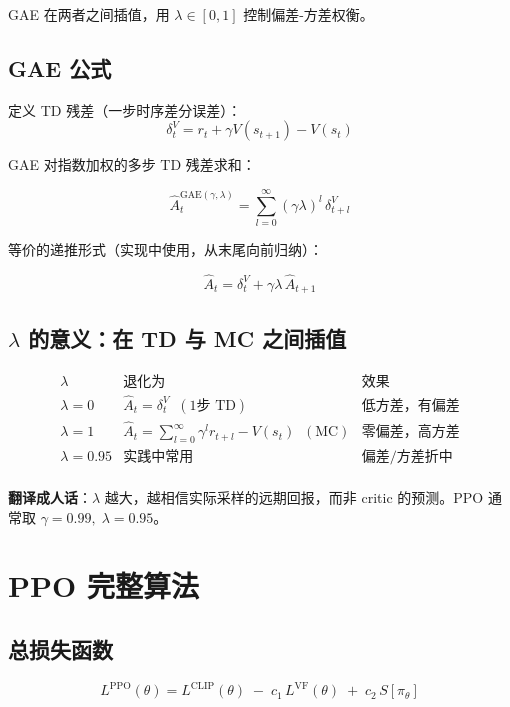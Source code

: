 \documentclass{article}
\begin{document}
GAE 在两者之间插值，用 $\lambda \in [0,1]$ 控制偏差-方差权衡。

\subsection*{GAE 公式}

定义 TD 残差（一步时序差分误差）：
\[
\delta_t^V = r_t + \gamma V(s_{t+1}) - V(s_t)
\]

GAE 对指数加权的多步 TD 残差求和：

\[
\boxed{\hat{A}_t^{\text{GAE}(\gamma,\lambda)} = \sum_{l=0}^{\infty}(\gamma\lambda)^l\,\delta_{t+l}^V}
\]

等价的递推形式（实现中使用，从末尾向前归纳）：

\[
\hat{A}_t = \delta_t^V + \gamma\lambda\,\hat{A}_{t+1}
\]

\subsection*{$\lambda$ 的意义：在 TD 与 MC 之间插值}

\[
\begin{array}{c|c|c}
\lambda & \text{退化为} & \text{效果} \\
\hline
\lambda = 0 & \hat{A}_t = \delta_t^V \;\;(\text{1步 TD}) & \text{低方差，有偏差} \\[4pt]
\lambda = 1 & \hat{A}_t = \displaystyle\sum_{l=0}^{\infty}\gamma^l r_{t+l} - V(s_t)\;\;(\text{MC}) & \text{零偏差，高方差} \\[6pt]
\lambda = 0.95 & \text{实践中常用} & \text{偏差/方差折中} \\
\end{array}
\]

\textbf{翻译成人话}：$\lambda$ 越大，越相信实际采样的远期回报，而非 critic 的预测。PPO 通常取 $\gamma = 0.99,\;\lambda = 0.95$。

\section*{PPO 完整算法}

\subsection*{总损失函数}

\[
\boxed{L^{\text{PPO}}(\theta)
  = L^{\text{CLIP}}(\theta)
  \;-\; c_1\,L^{\text{VF}}(\theta)
  \;+\; c_2\,S[\pi_\theta]}
\]
\end{document}

